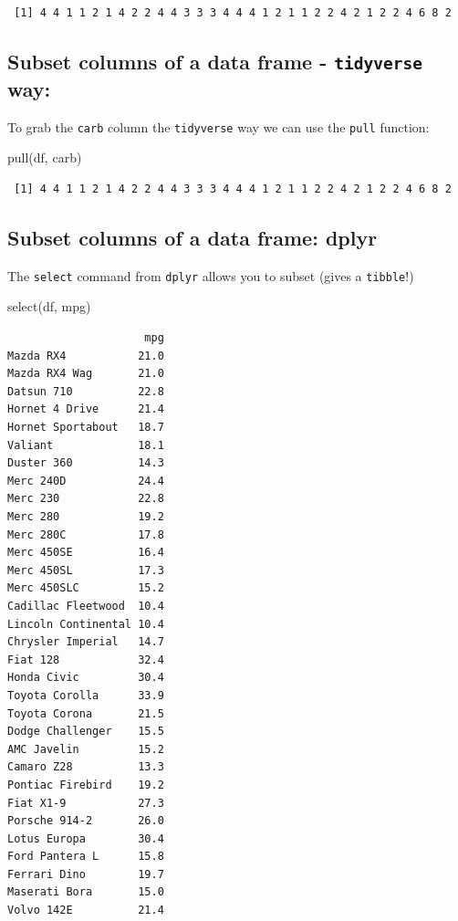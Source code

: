 \documentclass[
]{article}
\newenvironment{Shaded}{\begin{snugshade}}{\end{snugshade}}
\newcommand{\FunctionTok}[1]{\textcolor[rgb]{0.00,0.00,0.00}{#1}}
\newcommand{\NormalTok}[1]{#1}
\begin{document}
\begin{verbatim}
 [1] 4 4 1 1 2 1 4 2 2 4 4 3 3 3 4 4 4 1 2 1 1 2 2 4 2 1 2 2 4 6 8 2
\end{verbatim}

\hypertarget{subset-columns-of-a-data-frame---tidyverse-way}{%
\subsection{\texorpdfstring{Subset columns of a data frame -
\texttt{tidyverse}
way:}{Subset columns of a data frame - tidyverse way:}}\label{subset-columns-of-a-data-frame---tidyverse-way}}

To grab the \texttt{carb} column the \texttt{tidyverse} way we can use
the \texttt{pull} function:

\begin{Shaded}
\begin{Highlighting}[]
\FunctionTok{pull}\NormalTok{(df, carb)}
\end{Highlighting}
\end{Shaded}

\begin{verbatim}
 [1] 4 4 1 1 2 1 4 2 2 4 4 3 3 3 4 4 4 1 2 1 1 2 2 4 2 1 2 2 4 6 8 2
\end{verbatim}

\hypertarget{subset-columns-of-a-data-frame-dplyr}{%
\subsection{Subset columns of a data frame:
dplyr}\label{subset-columns-of-a-data-frame-dplyr}}

The \texttt{select} command from \texttt{dplyr} allows you to subset
(gives a \texttt{tibble}!)

\begin{Shaded}
\begin{Highlighting}[]
\FunctionTok{select}\NormalTok{(df, mpg)}
\end{Highlighting}
\end{Shaded}

\begin{verbatim}
                     mpg
Mazda RX4           21.0
Mazda RX4 Wag       21.0
Datsun 710          22.8
Hornet 4 Drive      21.4
Hornet Sportabout   18.7
Valiant             18.1
Duster 360          14.3
Merc 240D           24.4
Merc 230            22.8
Merc 280            19.2
Merc 280C           17.8
Merc 450SE          16.4
Merc 450SL          17.3
Merc 450SLC         15.2
Cadillac Fleetwood  10.4
Lincoln Continental 10.4
Chrysler Imperial   14.7
Fiat 128            32.4
Honda Civic         30.4
Toyota Corolla      33.9
Toyota Corona       21.5
Dodge Challenger    15.5
AMC Javelin         15.2
Camaro Z28          13.3
Pontiac Firebird    19.2
Fiat X1-9           27.3
Porsche 914-2       26.0
Lotus Europa        30.4
Ford Pantera L      15.8
Ferrari Dino        19.7
Maserati Bora       15.0
Volvo 142E          21.4
\end{verbatim}
\end{document}
